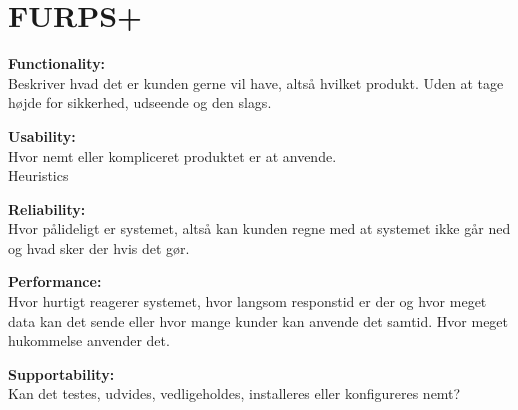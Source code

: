 \section{FURPS+}\label{sec:furps}

\textbf{Functionality:} \\
Beskriver hvad det er kunden gerne vil have, altså hvilket produkt. Uden at tage højde for sikkerhed, udseende og den slags.

\textbf{Usability:} \\
Hvor nemt eller kompliceret produktet er at anvende. \\
Heuristics

\textbf{Reliability:} \\
Hvor pålideligt er systemet, altså kan kunden regne med at systemet ikke går ned og hvad sker der hvis det gør.

\textbf{Performance:} \\
Hvor hurtigt reagerer systemet, hvor langsom responstid er der og hvor meget data kan det sende eller hvor mange kunder kan anvende det samtid. Hvor meget hukommelse anvender det.

\textbf{Supportability:} \\
Kan det testes, udvides, vedligeholdes, installeres eller konfigureres nemt?